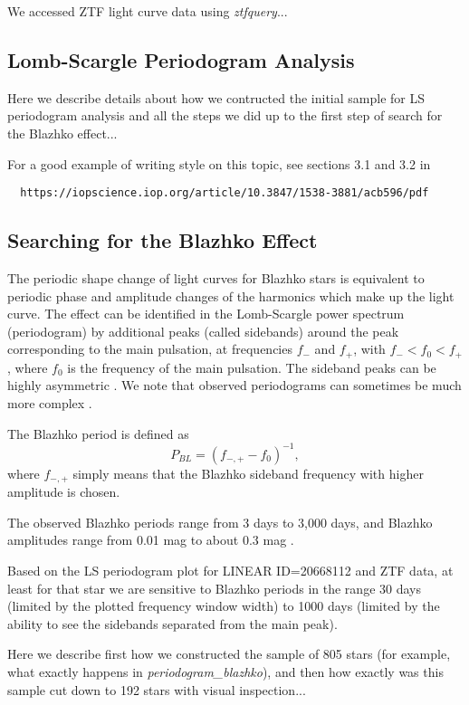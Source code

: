 We accessed ZTF light curve data using {\it ztfquery}...




\subsection{Lomb-Scargle Periodogram Analysis}

Here we describe details about how we contructed the initial sample for LS periodogram analysis and all the
steps we did up to the first step of search for the Blazhko effect... 

For a good example of writing style on this topic, see sections 3.1 and 3.2 in
\begin{verbatim}
  https://iopscience.iop.org/article/10.3847/1538-3881/acb596/pdf
\end{verbatim}

\subsection{Searching for the Blazhko Effect}

The periodic shape change of light curves for Blazhko stars is equivalent to periodic phase and amplitude changes of the
harmonics which make up the light curve. The effect can be identified in the Lomb-Scargle power spectrum (periodogram)
by additional peaks (called sidebands) around the peak corresponding to the main pulsation, at frequencies $f_-$ and $f_+$,
with $f_- < f_0 < f_+$, where $f_0$ is the frequency of the main pulsation. The sideband peaks can be highly asymmetric
\cite{2003ApJ...598..597A}. We note that observed periodograms can sometimes be much more complex \cite{2007MNRAS.377.1263S}. 

The Blazhko period is defined as
\begin{equation}
  P_{BL} = (f_{-,+} - f_0)^{-1},
\end{equation}
where $f_{-,+}$ simply means that the Blazhko sideband frequency with higher amplitude is chosen. 

The observed Blazhko periods range from 3 days to 3,000 days, and Blazhko amplitudes range from 0.01 mag to about 0.3 mag \citep{2007MNRAS.377.1263S}.


%

Based on the LS periodogram plot for LINEAR ID=20668112 and ZTF data, at least for that star we are
sensitive to Blazhko periods in the range 30 days (limited by the plotted frequency window width) to
1000 days (limited by the ability to see the sidebands separated from the main peak). 


Here we describe first how we constructed the sample of 805 stars (for example, what exactly happens in
{\it periodogram\_blazhko}), and then how exactly was this sample cut down to 192 stars with visual inspection... 